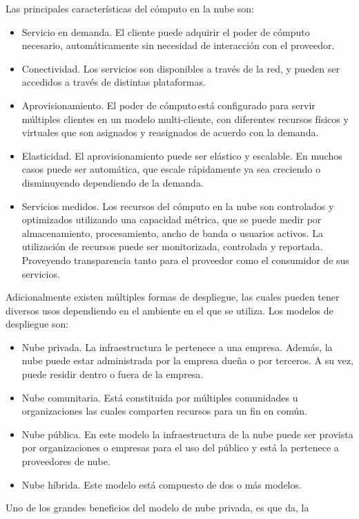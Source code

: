 \documentclass[12pt,twoside]{reedthesis}
\theoremstyle{definition}
\theoremstyle{definition}
\theoremstyle{definition}
\theoremstyle{remark}
\begin{document}
Las principales características del cómputo en la nube son:~ ~
\begin{itemize}
\item
  Servicio en demanda. El cliente puede adquirir el poder de cómputo
  necesario, automáticamente sin necesidad de interacción con el
  proveedor.~
\item
  Conectividad. Los servicios son disponibles a través de la red, y
  pueden ser accedidos a través de distintas plataformas.~~
\item
  Aprovisionamiento. El poder de cómputo\,está configurado para servir
  múltiples clientes en un modelo multi-cliente, con diferentes recursos
  físicos y virtuales que son asignados y reasignados de acuerdo con la
  demanda.~
\item
  Elasticidad. El aprovisionamiento puede ser elástico y escalable. En
  muchos casos puede ser automática, que escale rápidamente ya sea
  creciendo o disminuyendo dependiendo de la demanda.~
\item
  Servicios medidos. Los recursos del cómputo en la nube son controlados
  y optimizados utilizando una capacidad métrica, que se puede medir por
  almacenamiento, procesamiento, ancho de banda o usuarios activos. La
  utilización de recursos puede ser monitorizada, controlada y
  reportada. Proveyendo transparencia tanto para el proveedor como el
  consumidor de sus servicios.~~ ~
\end{itemize}
Adicionalmente existen múltiples formas de despliegue, las cuales pueden
tener diversos usos dependiendo en el ambiente en el que se utiliza. Los
modelos de despliegue son:~
\begin{itemize}
\item
  Nube privada. La infraestructura le pertenece a una empresa. Además,
  la nube puede estar administrada por la empresa dueña o por terceros.
  A su vez, puede residir dentro o fuera de la empresa.~
\item
  Nube comunitaria. Está constituida por múltiples comunidades u
  organizaciones las cuales comparten recursos para un fin en común.~
\item
  Nube pública. En este modelo la infraestructura de la nube puede ser
  provista por organizaciones o empresas para el uso del público y está
  la pertenece a proveedores de nube.~
\item
  Nube híbrida. Este modelo está compuesto de dos o más modelos.~
\end{itemize}
Uno de los grandes beneficios del modelo de nube privada, es que da, la
\end{document}
